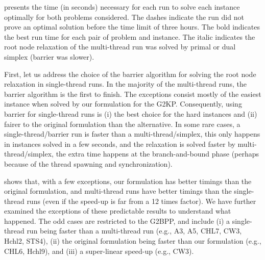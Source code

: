 \documentclass[9pt]{entcs}
\begin{document}
 presents the time (in seconds) necessary for each run to solve each instance optimally for both problems considered.
The dashes indicate the run did not prove an optimal solution before the time limit of three hours.
The bold indicates the best run time for each pair of problem and instance.
The italic indicates the root node relaxation of the multi-thread run was solved by primal or dual simplex (barrier was slower).

First, let us address the choice of the barrier algorithm for solving the root node relaxation in single-thread runs.
In the majority of the multi-thread runs, the barrier algorithm is the first to finish.
The exceptions consist mostly of the easiest instance when solved by our formulation for the G2KP.
Consequently, using barrier for single-thread runs is (i) the best choice for the hard instances and (ii) fairer to the original formulation than the alternative.
In some rare cases, a single-thread/barrier run is faster than a multi-thread/simplex, this only happens in instances solved in a few seconds, and the relaxation is solved faster by multi-thread/simplex, the extra time happens at the branch-and-bound phase (perhaps because of the thread spawning and synchronization).

 shows that, with a few exceptions, our formulation has better timings than the original formulation, and multi-thread runs have better timings than the single-thread runs (even if the speed-up is far from a 12 times factor).
We have further examined the exceptions of these predictable results to understand what happened.
The odd cases are restricted to the G2BPP, and include (i) a single-thread run being faster than a multi-thread run (e.g., A3, A5, CHL7, CW3, Hchl2, STS4), (ii) the original formulation being faster than our formulation (e.g., CHL6, Hchl9), and (iii) a super-linear speed-up (e.g., CW3).
\end{document}
